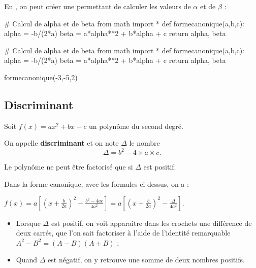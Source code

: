 \documentclass[a4paper,11pt]{article}
\begin{document}
\begin{calgo}
En \calgpython, on peut créer une  permettant de calculer les valeurs de $\alpha$ et de $\beta$ :

\begin{tcpythoncode}[15cm]
	\begin{pyverbatim}[][fontsize=\footnotesize,numbers=left,numbersep=10pt]
		# Calcul de alpha et de beta
		from math import *
		def formecanonique(a,b,c):
			alpha = -b/(2*a)
			beta = a*alpha**2 + b*alpha + c
			return alpha, beta
	\end{pyverbatim}
\end{tcpythoncode}

\begin{pyconcode}
# Calcul de alpha et de beta
from math import *
def formecanonique(a,b,c):
	alpha = -b/(2*a)
	beta = a*alpha**2 + b*alpha + c
	return alpha, beta
	

\end{pyconcode}

\begin{consolepython}[15cm]
\begin{pyconsole}[][framesep=3mm,frame=single,label={[\scriptsize Début de la console \logopython]\scriptsize Fin de la console \logopython},fontsize=\footnotesize,framerule=1pt,rulecolor=\color{ForestGreen}]
formecanonique(-3,-5,2)
\end{pyconsole}
\end{consolepython}
\medskip
\end{calgo}

\subsection{Discriminant}

\begin{cdefi}
Soit $f(x)=ax^2+bx+c$ un polynôme du second degré.

On appelle \textbf{discriminant} et on note $\Delta$ le nombre \[\Delta=b^2-4\times a \times c.\]
\end{cdefi}

\begin{cprop}
Le polynôme ne peut être factorisé que si $\Delta$ est positif.
\end{cprop}

\begin{cdemo}
Dans la forme canonique, avec les formules ci-dessus, on a :

$f(x)=a\left[ \left(x+ \frac{b}{2a} \right)^2-\frac{b^2-4ac}{4a^2} \right]=a\left[ \left(x+ \frac{b}{2a} \right)^2-\frac{\Delta}{4a^2} \right]$.

\begin{itemize}[leftmargin=*]
	\item Lorsque $\Delta$ est positif, on voit apparaître dans les crochets une différence de deux carrés, que l'on sait factoriser à l'aide de l'identité remarquable $A^2-B^2=(A-B)(A+B)$ ;
	\item Quand $\Delta$ est  négatif, on y retrouve une somme de deux nombres positifs.
\end{itemize}
\end{cdemo}
\end{document}
